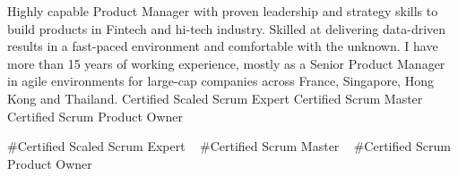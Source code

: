 

\begin{cvparagraph}


Highly capable Product Manager with proven leadership and strategy skills to build products in Fintech and hi-tech industry. Skilled at delivering data-driven results in a fast-paced environment and comfortable with the unknown. I have more than 15 years of working experience, mostly as a Senior Product Manager in agile environments for large-cap companies across France, Singapore, Hong Kong and Thailand.
\newline
\newline
Certified Scaled Scrum Expert
\newline
Certified Scrum Master
\newline
Certified Scrum Product Owner

\end{cvparagraph}
\begin{cvtechnologies}
 \#Certified Scaled Scrum Expert  ~
 \#Certified Scrum Master ~
 \#Certified Scrum Product Owner ~
\end{cvtechnologies}

